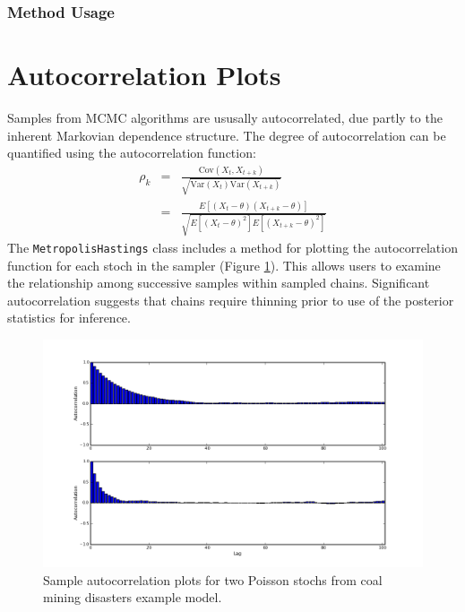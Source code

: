 \documentclass[]{book}
\begin{document}
\subsubsection{Method Usage}
\section{Autocorrelation Plots}

Samples from MCMC algorithms are ususally autocorrelated, due partly to the inherent Markovian dependence structure. The degree of autocorrelation can be quantified using the autocorrelation function:
\begin{eqnarray*}
    \rho_k &=& \frac{\mbox{Cov}(X_t, X_{t+k})}{\sqrt{\mbox{Var}(X_t)\mbox{Var}(X_{t+k})}} \\
            &=& \frac{E[(X_t - \theta)(X_{t+k} - \theta)]}{\sqrt{E[(X_t - \theta)^2] E[(X_{t+k} - \theta)^2]}}
\end{eqnarray*}
The \verb=MetropolisHastings= class includes a method for plotting the autocorrelation function for each stoch in the sampler (Figure \ref{fig:autocorr}). This allows users to examine the relationship among successive samples within sampled chains. Significant autocorrelation suggests that chains require thinning prior to use of the posterior statistics for inference.

\begin{figure}[htbp]
        \begin{center}
        \includegraphics[scale=0.4]{autocorr.png}
    \end{center}
    \caption{Sample autocorrelation plots for two Poisson stochs from coal mining disasters example model.}
    \label{fig:autocorr}
\end{figure}
\end{document}
